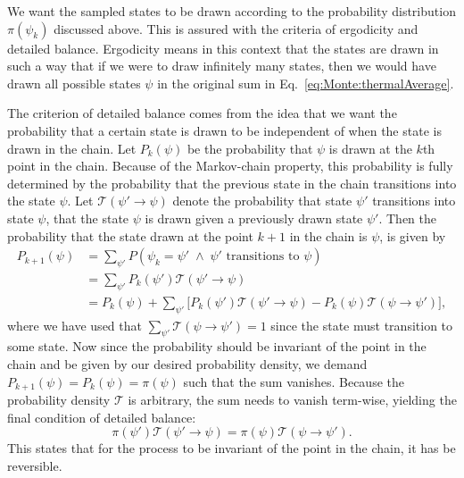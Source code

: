 We want the sampled states to be drawn according to the probability distribution $\pi(\psi_k)$ discussed above. This is assured
with the criteria of ergodicity and detailed balance. Ergodicity means in this context that the states are drawn in such a way
that if we were to draw infinitely many states, then we would have drawn all possible states $\psi$ in the original sum in
Eq.~\eqref{eq:Monte:thermalAverage}.

The criterion of detailed balance comes from the idea that we want the probability that
a certain state is drawn to be independent of when the state is drawn in the chain. Let $P_k(\psi)$ be the probability
that $\psi$ is drawn at the $k$th point in the chain. Because of the Markov-chain property, this probability is fully determined
by the probability that the previous state in the chain transitions into the state $\psi$. Let $\mathcal{T}(\psi'\to\psi)$ denote
the probability that state $\psi'$ transitions into state $\psi$, \ie that the state $\psi$ is drawn given a previously drawn
state $\psi'$. Then the probability that the state drawn at the point $k+1$ in the chain is $\psi$, is given by
\begin{equation}
    \label{eq:Monte:pointProbability}
    \begin{split}
        P_{k+1}(\psi) &= \sum_{\psi'}P(\psi_k = \psi'\;\land\;\psi'\text{ transitions to }\psi)\\
        &= \sum_{\psi'}P_k(\psi')\mathcal{T}(\psi'\to\psi)\\
        &= P_k(\psi) + \sum_{\psi'}\Big[P_k(\psi')\mathcal{T}(\psi'\to\psi) - P_k(\psi)\mathcal{T}(\psi\to\psi')\Big],
    \end{split}
\end{equation}
where we have used that $\sum_{\psi'}\mathcal{T}(\psi\to\psi') = 1$ since the state must transition to some state. Now since
the probability should be invariant of the point in the chain and be given by our desired probability density,
we demand $P_{k+1}(\psi) = P_k(\psi) = \pi(\psi)$ such that the sum vanishes.
Because the probability density $\mathcal{T}$ is arbitrary, the sum needs to vanish term-wise, yielding the final condition
of detailed balance:
\begin{equation}
    \label{eq:Monte:detailedBalance}
    \pi(\psi')\mathcal{T}(\psi'\to\psi) = \pi(\psi)\mathcal{T}(\psi\to\psi').
\end{equation}
This states that for the process to be invariant of the point in the chain, it has be reversible.

